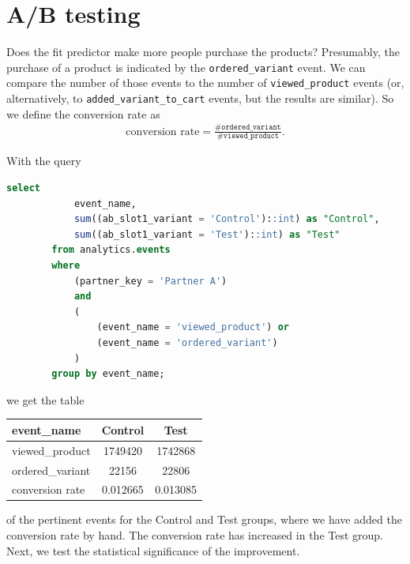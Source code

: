 \documentclass[12pt,a4paper]{article}
\begin{document}
    
    \clearpage
    
    \section{A/B testing}
    
    Does the fit predictor make more people purchase the products?
    Presumably,
    the purchase of a product is indicated 
    by
    the \verb|ordered_variant| event.
    We can compare the number of those events 
    to the number of \verb|viewed_product| events
    (or, alternatively, to \verb|added_variant_to_cart| events,
    but the results are similar).
    So we define the conversion rate 
    as
    \begin{align}
        \textrm{conversion rate}
        =
        \frac{ 
            \#\mathtt{ordered\_variant}
        }{
            \#\mathtt{viewed\_product}
        }
        .
    \end{align}
    
    With the query
    \begin{lstlisting}[language=SQL]
        select 
            event_name, 
            sum((ab_slot1_variant = 'Control')::int) as "Control", 
            sum((ab_slot1_variant = 'Test')::int) as "Test" 
        from analytics.events 
        where 
            (partner_key = 'Partner A') 
            and
            (
                (event_name = 'viewed_product') or 
                (event_name = 'ordered_variant')
            )
        group by event_name;
    \end{lstlisting}
    we get the table
    \begin{center}
        \begin{tabular}{l|cc}
            event\_name      & Control & Test    \\
            \hline
            viewed\_product  & 1749420 & 1742868 \\
            ordered\_variant & 22156   & 22806  \\
            \hline
            conversion rate & 0.012665 & 0.013085
        \end{tabular}
    \end{center}
    of the pertinent events 
    for the Control and Test groups,
    where we have added the conversion rate by hand.
    The conversion rate has increased in the Test group.
    Next, we test the statistical significance of the improvement.
    
\end{document}
